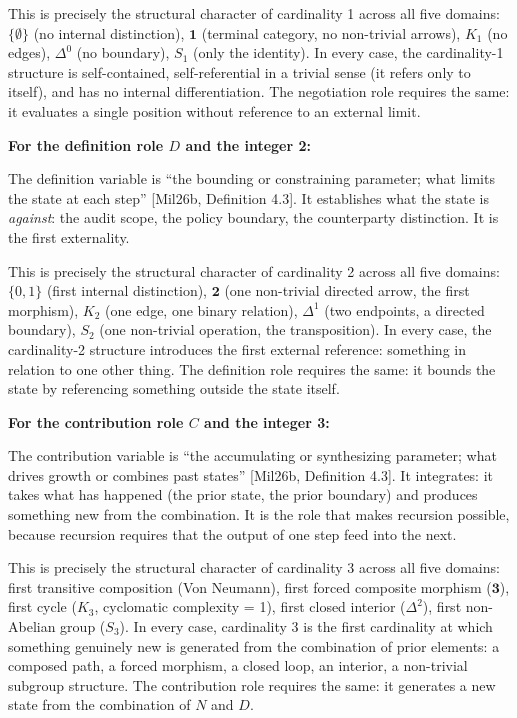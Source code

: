 \documentclass[12pt]{article}
\begin{document}
This is precisely the structural character of cardinality 1 across all
five domains: \(\{\emptyset\}\) (no internal distinction),
\(\mathbf{1}\) (terminal category, no non-trivial arrows), \(K_1\) (no
edges), \(\Delta^0\) (no boundary), \(S_1\) (only the identity). In
every case, the cardinality-1 structure is self-contained,
self-referential in a trivial sense (it refers only to itself), and has
no internal differentiation. The negotiation role requires the same: it
evaluates a single position without reference to an external limit.

\textbf{For the definition role \(D\) and the integer 2:}

The definition variable is ``the bounding or constraining parameter;
what limits the state at each step'' {[}Mil26b, Definition 4.3{]}. It
establishes what the state is \emph{against}: the audit scope, the
policy boundary, the counterparty distinction. It is the first
externality.

This is precisely the structural character of cardinality 2 across all
five domains: \(\{0,1\}\) (first internal distinction), \(\mathbf{2}\)
(one non-trivial directed arrow, the first morphism), \(K_2\) (one edge,
one binary relation), \(\Delta^1\) (two endpoints, a directed boundary),
\(S_2\) (one non-trivial operation, the transposition). In every case,
the cardinality-2 structure introduces the first external reference:
something in relation to one other thing. The definition role requires
the same: it bounds the state by referencing something outside the state
itself.

\textbf{For the contribution role \(C\) and the integer 3:}

The contribution variable is ``the accumulating or synthesizing
parameter; what drives growth or combines past states'' {[}Mil26b,
Definition 4.3{]}. It integrates: it takes what has happened (the prior
state, the prior boundary) and produces something new from the
combination. It is the role that makes recursion possible, because
recursion requires that the output of one step feed into the next.

This is precisely the structural character of cardinality 3 across all
five domains: first transitive composition (Von Neumann), first forced
composite morphism (\(\mathbf{3}\)), first cycle (\(K_3\), cyclomatic
complexity = 1), first closed interior (\(\Delta^2\)), first non-Abelian
group (\(S_3\)). In every case, cardinality 3 is the first cardinality
at which something genuinely new is generated from the combination of
prior elements: a composed path, a forced morphism, a closed loop, an
interior, a non-trivial subgroup structure. The contribution role
requires the same: it generates a new state from the combination of
\(N\) and \(D\).
\end{document}
